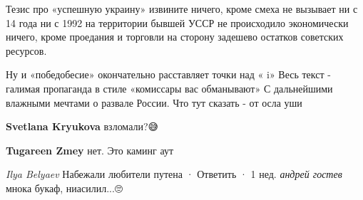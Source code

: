 \begin{itemize}
\begin{itemize}
Тезис про «успешную украину» извините ничего, кроме смеха не вызывает \Smiley[1.0][yellow] ни с
14 года ни с 1992 на территории бывшей УССР не происходило экономически ничего,
кроме проедания и торговли на сторону задешево остатков советских ресурсов. \Smiley[1.0][yellow]

Ну и «победобесие» окончательно расставляет точки над « i» Весь текст - галимая
пропаганда в стиле «комиссары вас обманывают» С дальнейшими влажными мечтами о
развале России. Что тут сказать - от осла уши \Smiley[1.0][yellow]
\end{itemize}

 
\textbf{Svetlana Kryukova} взломали?😅

\begin{itemize}
 
\textbf{Tugareen Zmey} нет. Это каминг аут
\end{itemize}

\emph{Ilya Belyaev}
Набежали любители путена
 · Ответить · 1 нед.
\emph{андрей гостев}
мнока букаф, ниасилил...🙄


\end{itemize}

